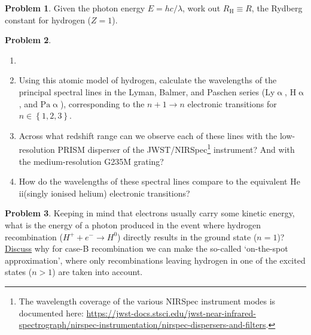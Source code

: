 \documentclass{article}
\newcommand{\Lya}{{Ly\ensuremath{\upalpha}}\xspace}
\newcommand{\HeII}{\hbox{He\,{\sc ii}}\xspace}
\newcommand{\Halpha}{\ensuremath{\mathrm{H}\upalpha}\xspace}
\newcommand{\Paalpha}{\ensuremath{\mathrm{Pa}\upalpha}\xspace}
\theoremstyle{definition}
\newtheorem{problem}{Problem}[section]
\begin{document}
\begin{problem}
    Given the photon energy $E = hc/\lambda$, work out $R_\mathrm{H} \equiv R$, the Rydberg constant for hydrogen ($Z = 1$).
\end{problem}
\begin{problem}
    \label{prob:HI_wavelengths}
    \begin{enumerate}[label=(\alph*)]
        \item[]
        \item Using this atomic model of hydrogen, calculate the wavelengths of the principal spectral lines in the Lyman, Balmer, and Paschen series (\Lya, \Halpha, and \Paalpha), corresponding to the $n+1 \rightarrow n$ electronic transitions for $n \in \left\{ 1, 2, 3 \right\}$.
        \item Across what redshift range can we observe each of these lines with the low-resolution PRISM disperser of the JWST/NIRSpec\footnote{The wavelength coverage of the various NIRSpec instrument modes is documented here: \url{https://jwst-docs.stsci.edu/jwst-near-infrared-spectrograph/nirspec-instrumentation/nirspec-dispersers-and-filters}.} instrument? And with the medium-resolution G235M grating?
        \item How do the wavelengths of these spectral lines compare to the equivalent \HeII (singly ionised helium) electronic transitions?
    \end{enumerate}
\end{problem}
\begin{problem}
    Keeping in mind that electrons usually carry some kinetic energy, what is the energy of a photon produced in the event where hydrogen recombination ($H^+ + e^- \rightarrow H^0$) directly results in the ground state ($n = 1$)? \underline{Discuss} why for case-B recombination we can make the so-called `on-the-spot approximation', where only recombinations leaving hydrogen in one of the excited states ($n > 1$) are taken into account.
\end{problem}
\end{document}
